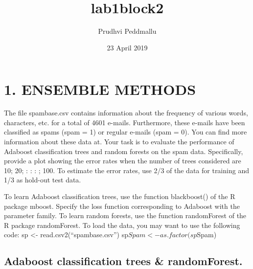 \documentclass[]{article}
\title{lab1block2}
\author{Prudhvi Peddmallu}
\date{23 April 2019}
\newenvironment{Shaded}{\begin{snugshade}}{\end{snugshade}}
\newcommand{\KeywordTok}[1]{\textcolor[rgb]{0.13,0.29,0.53}{\textbf{#1}}}
\newcommand{\DataTypeTok}[1]{\textcolor[rgb]{0.13,0.29,0.53}{#1}}
\newcommand{\DecValTok}[1]{\textcolor[rgb]{0.00,0.00,0.81}{#1}}
\newcommand{\FloatTok}[1]{\textcolor[rgb]{0.00,0.00,0.81}{#1}}
\newcommand{\StringTok}[1]{\textcolor[rgb]{0.31,0.60,0.02}{#1}}
\newcommand{\OperatorTok}[1]{\textcolor[rgb]{0.81,0.36,0.00}{\textbf{#1}}}
\newcommand{\NormalTok}[1]{#1}
\begin{document}
\maketitle

\section{1. ENSEMBLE METHODS}\label{ensemble-methods}

The file spambase.csv contains information about the frequency of
various words, characters, etc. for a total of 4601 e-mails.
Furthermore, these e-mails have been classified as spams (spam = 1) or
regular e-mails (spam = 0). You can find more information about these
data at. Your task is to evaluate the performance of Adaboost
classification trees and random forests on the spam data. Specifically,
provide a plot showing the error rates when the number of trees
considered are 10; 20; : : : ; 100. To estimate the error rates, use 2/3
of the data for training and 1/3 as hold-out test data.

To learn Adaboost classification trees, use the function blackboost() of
the R package mboost. Specify the loss function corresponding to
Adaboost with the parameter family. To learn random forests, use the
function randomForest of the R package randomForest. To load the data,
you may want to use the following code: sp \textless{}-
read.csv2(``spambase.csv'') sp\(Spam <- as.factor(sp\)Spam)

\subsection{Adaboost classification trees \&
randomForest.}\label{adaboost-classification-trees-randomforest.}

\begin{Shaded}
\end{Shaded}
\end{document}
